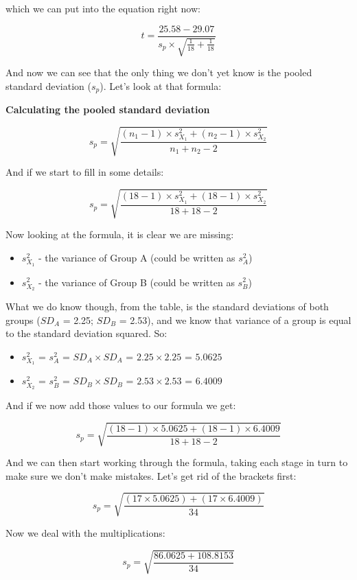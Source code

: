 \documentclass[
  oneside]{book}
\providecommand{\tightlist}{%
  \setlength{\itemsep}{0pt}\setlength{\parskip}{0pt}}
\begin{document}
which we can put into the equation right now:

\[t = \frac{25.58 - 29.07}{s_p \times \sqrt{\frac{1}{18} + \frac{1}{18}}}\]

And now we can see that the only thing we don't yet know is the pooled standard deviation (\(s_p\)). Let's look at that formula:

\textbf{Calculating the pooled standard deviation}

\[s_p = \sqrt{\frac{(n_1 -1)  \times s^2_{X_1} + (n_2 -1)\times s^2_{X_2}}{n_1 + n_2 - 2}}\]

And if we start to fill in some details:

\[s_p = \sqrt{\frac{(18 -1)  \times s^2_{X_1} + (18 -1)\times s^2_{X_2}}{18 + 18 - 2}}\]

Now looking at the formula, it is clear we are missing:

\begin{itemize}
\tightlist
\item
  \(s^2_{X_1}\) - the variance of Group A (could be written as \(s^2_{A}\))
\item
  \(s^2_{X_2}\) - the variance of Group B (could be written as \(s^2_{B}\))
\end{itemize}

What we do know though, from the table, is the standard deviations of both groups (\(SD_A\) = 2.25; \(SD_B\) = 2.53), and we know that variance of a group is equal to the standard deviation squared. So:

\begin{itemize}
\tightlist
\item
  \(s^2_{X_1}\) = \(s^2_A\) = \(SD_A \times SD_A\) = \(2.25 \times 2.25\) = \(5.0625\)
\item
  \(s^2_{X_2}\) = \(s^2_B\) = \(SD_B \times SD_B\) = \(2.53 \times 2.53\) = \(6.4009\)
\end{itemize}

And if we now add those values to our formula we get:

\[s_p = \sqrt{\frac{(18 -1)  \times 5.0625 + (18 -1)\times 6.4009}{18 + 18 - 2}}\]

And we can then start working through the formula, taking each stage in turn to make sure we don't make mistakes. Let's get rid of the brackets first:

\[s_p = \sqrt{\frac{(17  \times 5.0625) + (17 \times 6.4009)}{34}}\]

Now we deal with the multiplications:

\[s_p = \sqrt{\frac{86.0625 + 108.8153}{34}}\]
\end{document}
